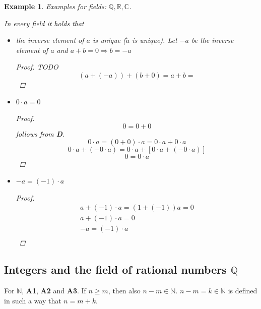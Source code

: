 \documentclass[a4paper,landscape,twocolumn]{article}
\newtheorem{ex}{Example}
\begin{document}
\begin{ex}
  Examples for fields: $\mathbb{Q}, \mathbb{R}, \mathbb{C}$.

  In every field it holds that
  \begin{itemize}
    \item the inverse element of $a$ is unique ($\tilde a$ is unique).
      Let $-a$ be the inverse element of $a$ and $a + b = 0 \Rightarrow b = -a$
      \begin{proof}
        TODO
        \[ (a + (-a)) + (b + 0) = a + b =  \]
      \end{proof}
    \item $0 \cdot a = 0$
      \begin{proof}
        \[ 0 = 0 + 0 \]
        follows from \textbf{D}.
        \[ 0 \cdot a = (0 + 0) \cdot a = 0 \cdot a + 0 \cdot a \]
        \[ 0 \cdot a + (-0 \cdot a) = 0 \cdot a + \left[0 \cdot a + (-0 \cdot a)\right] \]
        \[ 0 = 0 \cdot a \]
      \end{proof}
    \item $-a = (-1) \cdot a$
      \begin{proof}
        \begin{align*}
          a + (-1) \cdot a = (1 + (-1)) a = 0 \\
          a + (-1) \cdot a = 0 \\
          -a = (-1) \cdot a \\
        \end{align*}
      \end{proof}
  \end{itemize}
\end{ex}

\subsection{Integers and the field of rational numbers $\mathbb{Q}$}
%
For $\mathbb{N}$, \textbf{A1}, \textbf{A2} and \textbf{A3}.
If $n \geq m$, then also $n - m \in \mathbb{N}$.
$n-m = k \in \mathbb{N}$ is defined in such a way that $n = m + k$.
\end{document}
